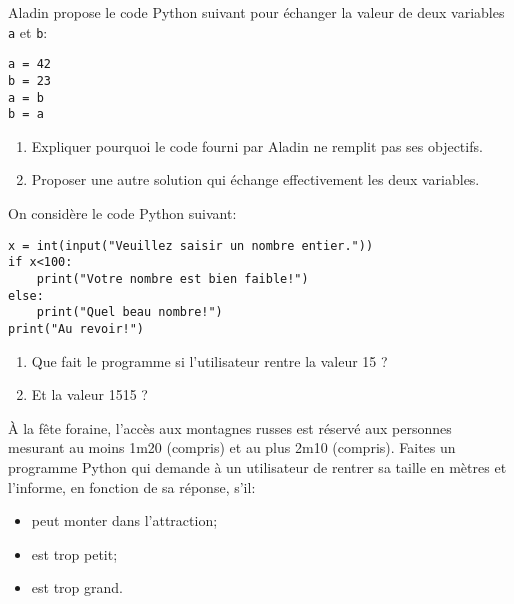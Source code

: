 \begin{exercise}
	Aladin propose le code Python suivant pour échanger la valeur de deux variables \texttt{a} et \texttt{b}:
	\begin{center}
		\begin{varwidth}[t]{\textwidth}
	\begin{lstlisting}[language=iPython,linewidth = 3cm]
a = 42
b = 23
a = b
b = a
\end{lstlisting}	
		\end{varwidth}
\end{center}
	\begin{enumerate}
		\item Expliquer pourquoi le code fourni par Aladin ne remplit pas ses objectifs.
		\item Proposer une autre solution qui échange effectivement les deux variables.
	\end{enumerate}
\end{exercise}

\newpage

\begin{exercise}
	On considère le code Python suivant:
	
	\begin{center}
		\begin{varwidth}[t]{\textwidth}
	\begin{lstlisting}[language=iPython,linewidth = 13cm]
x = int(input("Veuillez saisir un nombre entier."))
if x<100:
    print("Votre nombre est bien faible!")
else:
    print("Quel beau nombre!")
print("Au revoir!")
\end{lstlisting}
		\end{varwidth}
\end{center}
\begin{enumerate}
	\item Que fait le programme si l'utilisateur rentre la valeur 15 ?
	\item Et la valeur 1515 ?
\end{enumerate}
\end{exercise}


\begin{exercise}
	À la fête foraine, l'accès aux montagnes russes est réservé aux personnes mesurant au moins 1m20 (compris) et au plus 2m10 (compris). Faites un programme Python qui demande à un utilisateur de rentrer sa taille en mètres et l'informe, en fonction de sa réponse, s'il:
	\begin{itemize}
		\item peut monter dans l'attraction;
		\item est trop petit;
		\item est trop grand.
	\end{itemize}
\end{exercise}

